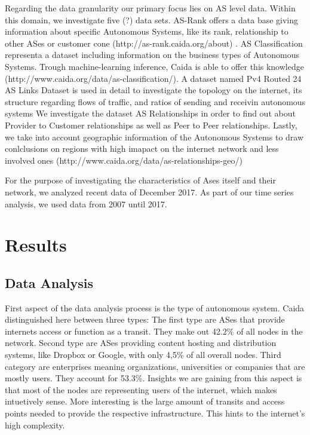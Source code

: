 \documentclass[conference]{IEEEtran}
\begin{document}
Regarding the data granularity our primary focus lies on AS level data. Within this domain, we investigate five (?) data sets. AS-Rank offers a data base giving information about specific Autonomous Systems, like its rank, relationship to other ASes or customer cone (http://as-rank.caida.org/about) . AS Classification representa a dataset including information on the business types of Autonomous Systems. Trough machine-learning inference, Caida is able to offer this knowledge (http://www.caida.org/data/as-classification/). A dataset named Pv4 Routed 24 AS Links Dataset is used in detail to investigate the topology on the internet, its structure regarding flows of traffic, and ratios of sending and receivin autonomous systems %
We investigate the dataset AS Relationships in order to find out about Provider to Customer relationships as well as Peer to Peer relationships.  Lastly, we take into account geographic information of the Autonomous Systems to draw conlclusions on regions with high imapact on the internet network and less involved ones (http://www.caida.org/data/as-relationships-geo/)


For the purpose of investigating the characteristics of Ases itself and their network, we analyzed recent data of December 2017.  As part of our time series analysis, we used data from 2007 until 2017. 


\section{Results}

\subsection{Data Analysis}
First aspect of the data analysis process is the type of autonomous system. Caida distinguished here between three types: The first type are ASes that provide internets access or function as a transit. They make out 42.2\% of all nodes in the network. Second type are ASes providing content hosting and distribution systems, like Dropbox or Google, with only 4,5\% of all overall nodes. Third category are enterprises meaning organizations, universities or companies that are mostly users. They account for 53.3\%. Insights we are gaining from this aspect is that most of the nodes are representing users of the internet, which makes intuetively sense. More interesting is the large amount of transits and access points needed to provide the respective infrastructure. This hints to the internet's high complexity. 
\end{document}
